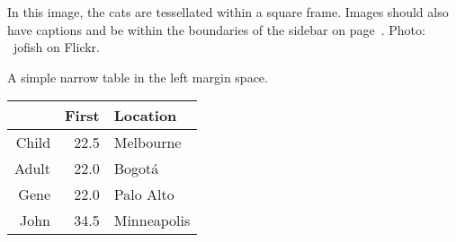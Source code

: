 \documentclass[sigchi-a, authorversion]{acmart}
\begin{document}
\begin{marginfigure}
    \caption{In this image, the cats are tessellated within a square
      frame. Images should also have captions and be within the
      boundaries of the sidebar on page~\pageref{bar:sidebar}. Photo:
      \cczero~jofish on Flickr.}
    \label{fig:marginfig}
\end{marginfigure}

\begin{margintable}
    \caption{A simple narrow table in the left margin
      space.}
    \label{tab:table2}
    \begin{tabular}{r r l}
      & {\small \textbf{First}}
      & {\small \textbf{Location}} \\
      \toprule
      Child & 22.5 & Melbourne \\
      Adult & 22.0 & Bogot\'a \\
      \midrule
      Gene & 22.0 & Palo Alto \\
      John & 34.5 & Minneapolis \\
      \bottomrule
    \end{tabular}
\end{margintable}



\end{document}
